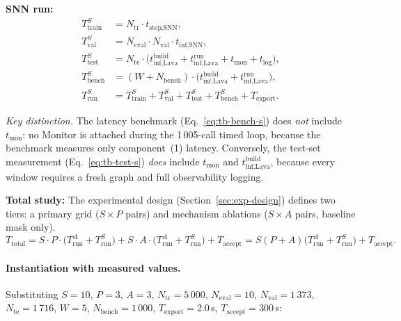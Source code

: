\documentclass[11pt,a4paper]{article}
\begin{document}
\noindent\textbf{SNN run:}
\begin{align}
  T_{\text{train}}^{S}
    &= N_{\text{tr}} \cdot t_{\text{step,SNN}}, \label{eq:tb-train-s} \\
  T_{\text{val}}^{S}
    &= N_{\text{eval}} \cdot N_{\text{val}} \cdot t_{\text{inf,SNN}},
       \label{eq:tb-val-s} \\
  T_{\text{test}}^{S}
    &= N_{\text{te}} \cdot
       \bigl(
         t_{\text{inf,Lava}}^{\text{build}}
       + t_{\text{inf,Lava}}^{\text{run}}
       + t_{\text{mon}}
       + t_{\text{log}}
       \bigr), \label{eq:tb-test-s} \\
  T_{\text{bench}}^{S}
    &= (W + N_{\text{bench}}) \cdot
       \bigl(
         t_{\text{inf,Lava}}^{\text{build}}
       + t_{\text{inf,Lava}}^{\text{run}}
       \bigr), \label{eq:tb-bench-s} \\
  T_{\text{run}}^{S}
    &= T_{\text{train}}^{S} + T_{\text{val}}^{S}
     + T_{\text{test}}^{S}
     + T_{\text{bench}}^{S} + T_{\text{export}}.
       \label{eq:tb-run-s}
\end{align}

\noindent\emph{Key distinction.}
The latency benchmark (Eq.~\ref{eq:tb-bench-s}) does \emph{not}
include $t_{\text{mon}}$: no Monitor is attached during the
1\,005-call timed loop, because the benchmark measures only
component~(1) latency.  Conversely, the test-set measurement
(Eq.~\ref{eq:tb-test-s}) \emph{does} include $t_{\text{mon}}$ and
$t_{\text{inf,Lava}}^{\text{build}}$, because every window requires a
fresh graph and full observability logging.

\medskip\noindent\textbf{Total study:}
The experimental design (Section~\ref{sec:exp-design}) defines two
tiers: a primary grid ($S \times P$ pairs) and mechanism ablations
($S \times A$ pairs, baseline mask only).
\begin{equation}\label{eq:tb-total}
  T_{\text{total}} = S \cdot P \cdot
    \bigl(T_{\text{run}}^{A} + T_{\text{run}}^{S}\bigr)
  + S \cdot A \cdot
    \bigl(T_{\text{run}}^{A} + T_{\text{run}}^{S}\bigr)
  + T_{\text{accept}}
  = S(P + A)
    \bigl(T_{\text{run}}^{A} + T_{\text{run}}^{S}\bigr)
  + T_{\text{accept}}.
\end{equation}

\paragraph{Instantiation with measured values.}
Substituting $S = 10$, $P = 3$, $A = 3$,
$N_{\text{tr}} = 5\,000$,
$N_{\text{eval}} = 10$, $N_{\text{val}} = 1\,373$,
$N_{\text{te}} = 1\,716$, $W = 5$, $N_{\text{bench}} = 1\,000$,
$T_{\text{export}} = 2.0$\,s, $T_{\text{accept}} = 300$\,s:
\end{document}
